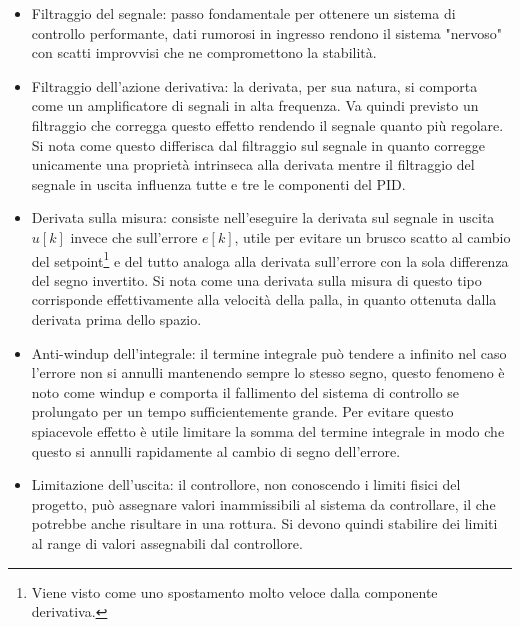 \documentclass[12pt,twoside,openright]{report}
\begin{document}
\begin{itemize}
\item Filtraggio del segnale: passo fondamentale per ottenere un sistema di controllo performante, dati rumorosi in ingresso rendono il sistema "nervoso" con scatti improvvisi che ne compromettono la stabilità.
\item Filtraggio dell'azione derivativa: la derivata, per sua natura, si comporta come un amplificatore di segnali in alta frequenza. Va quindi previsto un filtraggio che corregga questo effetto rendendo il segnale quanto più regolare. Si nota come questo differisca dal filtraggio sul segnale in quanto corregge unicamente una proprietà intrinseca alla derivata mentre il filtraggio del segnale in uscita influenza tutte e tre le componenti del PID. %
\item Derivata sulla misura: consiste nell'eseguire la derivata sul segnale in uscita $u[k]$ invece che sull'errore $e[k]$, utile per evitare un brusco scatto al cambio del setpoint\footnote{Viene visto come uno spostamento molto veloce dalla componente derivativa.} e del tutto analoga alla derivata sull'errore con la sola differenza del segno invertito. Si nota come una derivata sulla misura di questo tipo corrisponde effettivamente alla velocità della palla, in quanto ottenuta dalla derivata prima dello spazio.
\item Anti-windup dell'integrale: il termine integrale può tendere a infinito nel caso l'errore non si annulli mantenendo sempre lo stesso segno, questo fenomeno è noto come windup e comporta il fallimento del sistema di controllo se prolungato per un tempo sufficientemente grande. Per evitare questo spiacevole effetto è utile limitare la somma del termine integrale in modo che questo si annulli rapidamente al cambio di segno dell'errore.
\item Limitazione dell'uscita: il controllore, non conoscendo i limiti fisici del progetto, può assegnare valori inammissibili al sistema da controllare, il che potrebbe anche risultare in una rottura. Si devono quindi stabilire dei limiti al range di valori assegnabili dal controllore.
\end{itemize}
\end{document}
